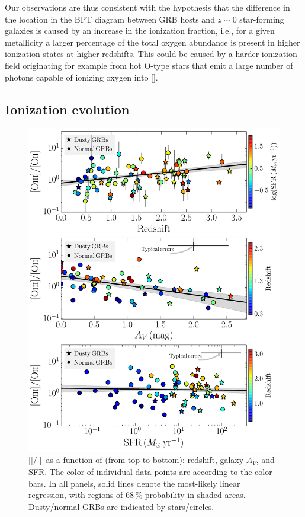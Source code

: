 \documentclass[traditabstract, longauth]{aa}
\newcommand{\oii}{[\ion{O}{ii}]}
\newcommand{\oiii}{[\ion{O}{iii}]}
\begin{document}
 {Our observations are thus consistent with the hypothesis} that the difference in the location in the BPT diagram between GRB hosts and $z\sim0$ star-forming galaxies is caused by an increase in the ionization fraction, i.e., for a given metallicity a larger percentage of the total oxygen abundance is present in higher ionization states at higher redshifts. This could be caused by a harder ionization field originating for example from hot O-type stars \citep{2014ApJ...795..165S} that emit a large number of photons capable of ionizing oxygen into \oiii. 



\subsection{Ionization evolution}

\begin{figure}
\includegraphics[angle=0, width=0.99\columnwidth]{Figs/OIIOIII.pdf}
\caption{\oiii/\oii\, as a function of (from top to bottom): redshift, galaxy $A_V$, and SFR. The color of individual data points are according to the color bars. In all panels, solid lines denote the most-likely linear regression, with regions of 68\,\% probability in shaded areas. Dusty/normal GRBs are indicated by stars/circles.}
\label{fig:ionization}
\end{figure}
\end{document}

